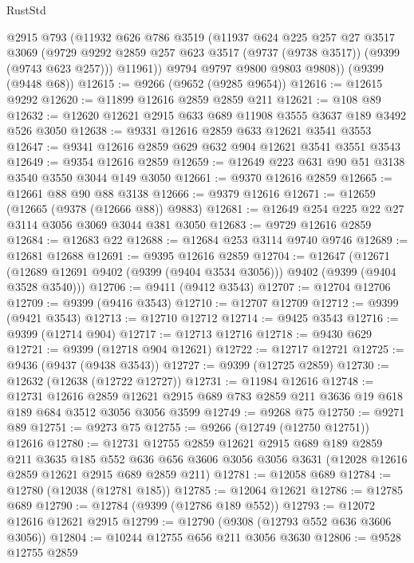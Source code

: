 \begin{lexlean}{RustStd}
\begin{coremodule}
        @2915
        @793
        (@11932
          @626
          @786
          @3519
          (@11937
            @624
            @225
            @257
            @27
            @3517
            @3069
            (@9729 @9292 @2859 @257 @623 @3517 (@9737 (@9738 @3517)) (@9399 (@9743 @623 @257)))
            @11961))
        @9794
        @9797
        @9800
        @9803
        @9808))
    (@9399 (@9448 @68))
@12615 := @9266 (@9652 (@9285 @9654))
@12616 := @12615 @9292
@12620 := @11899 @12616 @2859 @2859 @211
@12621 := @108 @89
@12632 := @12620 @12621 @2915 @633 @689 @11908 @3555 @3637 @189 @3492 @526 @3050
@12638 := @9331 @12616 @2859 @633 @12621 @3541 @3553
@12647 := @9341 @12616 @2859 @629 @632 @904 @12621 @3541 @3551 @3543
@12649 := @9354 @12616 @2859
@12659 := @12649 @223 @631 @90 @51 @3138 @3540 @3550 @3044 @149 @3050
@12661 := @9370 @12616 @2859
@12665 := @12661 @88 @90 @88 @3138
@12666 := @9379 @12616
@12671 := @12659 (@12665 (@9378 (@12666 @88)) @9883)
@12681 := @12649 @254 @225 @22 @27 @3114 @3056 @3069 @3044 @381 @3050
@12683 := @9729 @12616 @2859
@12684 := @12683 @22
@12688 := @12684 @253 @3114 @9740 @9746
@12689 := @12681 @12688
@12691 := @9395 @12616 @2859
@12704 := @12647
    (@12671 (@12689 @12691 @9402 (@9399 (@9404 @3534 @3056))) @9402 (@9399 (@9404 @3528 @3540)))
@12706 := @9411 (@9412 @3543)
@12707 := @12704 @12706
@12709 := @9399 (@9416 @3543)
@12710 := @12707 @12709
@12712 := @9399 (@9421 @3543)
@12713 := @12710 @12712
@12714 := @9425 @3543
@12716 := @9399 (@12714 @904)
@12717 := @12713 @12716
@12718 := @9430 @629
@12721 := @9399 (@12718 @904 @12621)
@12722 := @12717 @12721
@12725 := @9436 (@9437 (@9438 @3543))
@12727 := @9399 (@12725 @2859)
@12730 := @12632 (@12638 (@12722 @12727))
@12731 := @11984 @12616
@12748 := @12731
    @12616
    @2859
    @12621
    @2915
    @689
    @783
    @2859
    @211
    @3636
    @19
    @618
    @189
    @684
    @3512
    @3056
    @3056
    @3599
@12749 := @9268 @75
@12750 := @9271 @89
@12751 := @9273 @75
@12755 := @9266 (@12749 (@12750 @12751)) @12616
@12780 := @12731
    @12755
    @2859
    @12621
    @2915
    @689
    @189
    @2859
    @211
    @3635
    @185
    @552
    @636
    @656
    @3606
    @3056
    @3056
    @3631
    (@12028 @12616 @2859 @12621 @2915 @689 @2859 @211)
@12781 := @12058 @689
@12784 := @12780 (@12038 (@12781 @185))
@12785 := @12064 @12621
@12786 := @12785 @689
@12790 := @12784 (@9399 (@12786 @189 @552))
@12793 := @12072 @12616 @12621 @2915
@12799 := @12790 (@9308 (@12793 @552 @636 @3606 @3056))
@12804 := @10244 @12755 @656 @211 @3056 @3630
@12806 := @9528 @12755 @2859

\end{coremodule}
\end{lexlean}
